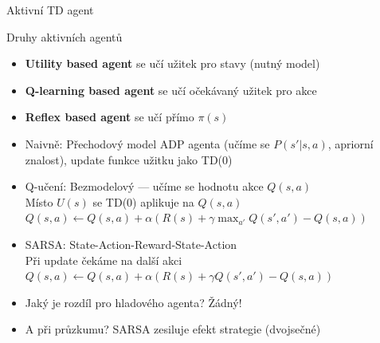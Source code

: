 \documentclass{beamer}
\begin{document}

\begin{frame}{Aktivní TD agent}
\begin{block}{Druhy aktivních agentů}
\begin{itemize}
\item {\bf Utility based agent} se učí užitek pro stavy (nutný model)
\item {\bf Q-learning based agent} se učí očekávaný užitek pro akce
\item {\bf Reflex based agent} se učí přímo $\pi(s)$
\end{itemize}
\end{block}
\begin{itemize}
\item Naivně: Přechodový model ADP agenta (učíme se $P(s'|s,a)$, apriorní znalost), update funkce užitku jako TD(0)
\item Q-učení: Bezmodelový --- učíme se hodnotu akce $Q(s,a)$ \\
	Místo $U(s)$ se TD(0) aplikuje na $Q(s,a)$ \\
	 \pause
	$Q(s,a) \leftarrow Q(s,a) + \alpha(R(s) + \gamma \max_{a'} Q(s',a') - Q(s,a))$
\pause
\item SARSA: State-Action-Reward-State-Action \\
	Při update čekáme na další akci \\
	$Q(s,a) \leftarrow Q(s,a) + \alpha(R(s) + \gamma Q(s',a') - Q(s,a))$
\item Jaký je rozdíl pro hladového agenta? \pause Žádný!
\item A při průzkumu? \pause SARSA zesiluje efekt strategie \pause (dvojsečné)
\end{itemize}
\end{frame}
\end{document}
